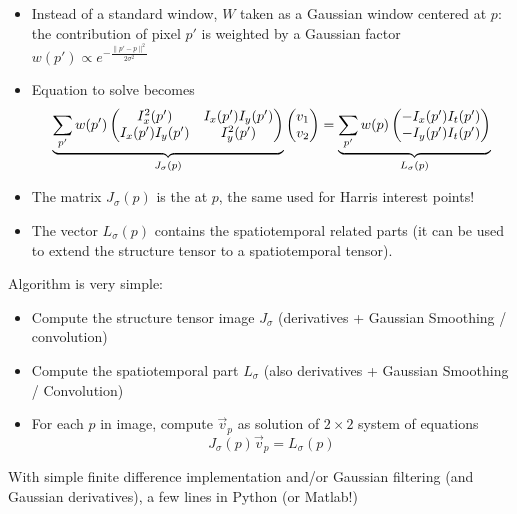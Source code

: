 \documentclass[10pt]{beamer}
\newcommand{\myemph}[1]{{\color{blue}{#1}}}
\begin{document}
\begin{frame}
  \begin{itemize}
  \item Instead of a standard window, $W$ taken as a Gaussian window centered at $p$:
    the contribution of pixel $p'$ is weighted by a Gaussian factor $w(p') \propto e^{-\frac{\|p'-p\|^2}{2\sigma^2}}$
  \item Equation to solve becomes{\small
    $$\underset{J_\sigma(p)}{\underbrace{
    \sum_{p'}w(p')
    \begin{pmatrix}
      I_x^2(p') & I_x(p')I_y(p')\\
      I_x(p')I_y(p') & I_y^2(p')
    \end{pmatrix}}}
    \begin{pmatrix}
      v_1\\v_2
    \end{pmatrix}
    =\underset{L_\sigma(p)}{\underbrace{
    \sum_{p'}w(p)
    \begin{pmatrix}
      -I_x(p')I_t(p')\\
      -I_y(p')I_t(p')
    \end{pmatrix}}}
    $$}
  \item The matrix $J_\sigma(p)$ is the \myemph{structure tensor} at $p$, the same used for Harris interest points!
  \item The vector $L_\sigma(p)$ contains the spatiotemporal related parts (it can be used to extend
    the structure tensor to a spatiotemporal tensor).
  \end{itemize}
\end{frame}


\begin{frame}
  Algorithm is very simple:
  \begin{itemize}
  \item Compute the structure tensor image $J_\sigma$ (derivatives + Gaussian Smoothing / convolution)
  \item Compute the spatiotemporal part $L_\sigma$ (also derivatives + Gaussian Smoothing / Convolution)
  \item For each $p$ in image, compute $\vec{v}_p$ as solution of $2\times 2$ system of equations
    $$
    J_\sigma(p)\vec{v}_p = L_\sigma(p)
    $$
  \end{itemize}
  With simple finite difference implementation and/or Gaussian
  filtering (and Gaussian derivatives), a few lines in Python (or
  Matlab!)
\end{frame}
\end{document}
